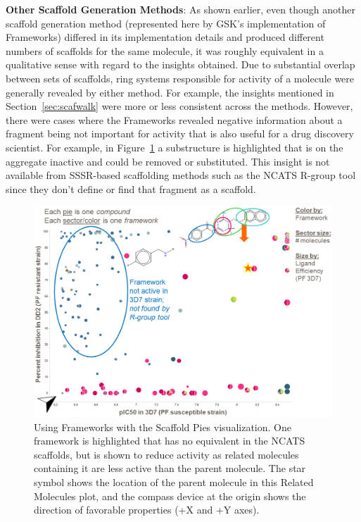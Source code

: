 \documentclass[journal=jacsat,manuscript=article]{achemso}
\newcommand*\fref[1]{Figure~\ref{fig:#1}}
\newcommand*\sref[1]{Section~\ref{sec:#1}}
\begin{document}
{\bf Other Scaffold Generation Methods}: As shown earlier, even though another scaffold generation method (represented here by GSK's implementation of Frameworks) differed in its implementation details and produced different numbers of scaffolds for the same molecule, it was roughly equivalent in a qualitative sense with regard to the insights obtained. Due to substantial overlap between sets of scaffolds, ring systems responsible for activity of a molecule were generally revealed by either method. For example, the insights mentioned in \sref{scafwalk} were more or less consistent across the methods. However, there were cases where the Frameworks revealed negative information about a fragment being not important for activity that is also useful for a drug discovery scientist. For example, in \fref{frameswalk} a substructure is highlighted that is on the aggregate inactive and could be removed or substituted. This insight is not available from SSSR-based scaffolding methods such as the NCATS R-group tool since they don't define or find that fragment as a scaffold.

\begin{figure}
\includegraphics[width=5in]{fig/mol1_frames_scafpie.png}
\caption{Using Frameworks with the Scaffold Pies visualization. One framework is highlighted that has no equivalent in the NCATS scaffolds, but is shown to reduce activity as related molecules containing it are less active than the parent molecule.   The star symbol shows the location of the parent molecule in this Related Molecules plot, and the compass device at the origin shows the direction of favorable properties (+X and +Y axes).}      
\label{fig:frameswalk}
\end{figure}
\end{document}
